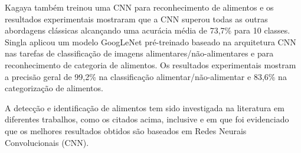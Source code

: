 Kagaya \cite{kagaya2014food} também treinou uma CNN para reconhecimento de alimentos e os resultados experimentais mostraram que a CNN superou todas as outras abordagens clássicas alcançando uma acurácia média de 73,7\% para 10 classes. Singla \cite{singla2016food} aplicou um modelo GoogLeNet pré-treinado baseado na arquitetura CNN nas tarefas de classificação de imagens alimentares/não-alimentares e para reconhecimento de categoria de alimentos. Os resultados experimentais mostram a precisão geral de 99,2\% na classificação alimentar/não-alimentar e 83,6\% na categorização de alimentos. 

A detecção e identificação de alimentos tem sido investigada na literatura em diferentes trabalhos, como os citados acima, inclusive \cite{aguilar2017food} e \cite{pouladzadeh2017cloud} em que foi evidenciado que os melhores resultados obtidos são baseados em Redes Neurais Convolucionais (CNN).






